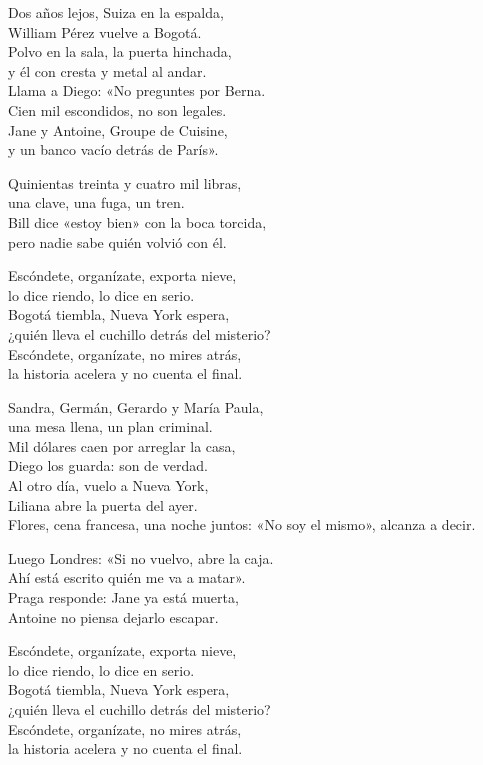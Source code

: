 \begin{lyrics}
Dos años lejos, Suiza en la espalda,\\
William Pérez vuelve a Bogotá.\\
Polvo en la sala, la puerta hinchada,\\
y él con cresta y metal al andar.\\
Llama a Diego: «No preguntes por Berna.\\
Cien mil escondidos, no son legales.\\
Jane y Antoine, Groupe de Cuisine,\\
y un banco vacío detrás de París».

Quinientas treinta y cuatro mil libras,\\
una clave, una fuga, un tren.\\
Bill dice «estoy bien» con la boca torcida,\\
pero nadie sabe quién volvió con él.

Escóndete, organízate, exporta nieve,\\
lo dice riendo, lo dice en serio.\\
Bogotá tiembla, Nueva York espera,\\
¿quién lleva el cuchillo detrás del misterio?\\
Escóndete, organízate, no mires atrás,\\
la historia acelera y no cuenta el final.

Sandra, Germán, Gerardo y María Paula,\\
una mesa llena, un plan criminal.\\
Mil dólares caen por arreglar la casa,\\
Diego los guarda: son de verdad.\\
Al otro día, vuelo a Nueva York,\\
Liliana abre la puerta del ayer.\\
Flores, cena francesa, una noche juntos:
«No soy el mismo», alcanza a decir.

Luego Londres: «Si no vuelvo, abre la caja.\\
Ahí está escrito quién me va a matar».\\
Praga responde: Jane ya está muerta,\\
Antoine no piensa dejarlo escapar.

Escóndete, organízate, exporta nieve,\\
lo dice riendo, lo dice en serio.\\
Bogotá tiembla, Nueva York espera,\\
¿quién lleva el cuchillo detrás del misterio?\\
Escóndete, organízate, no mires atrás,\\
la historia acelera y no cuenta el final.


\end{lyrics}
